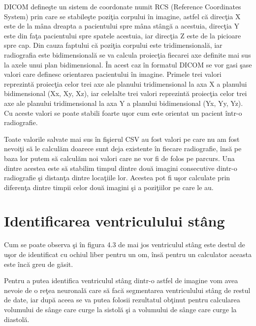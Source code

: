 \par

DICOM define\c{s}te un sistem de coordonate numit RCS (Reference Coordinates System) prin care se stabile\c{s}te pozi\c{t}ia corpului  \^{i}n imagine, astfel c\u{a} direc\c{t}ia X este de la m\^{a}na dreapta a pacientului spre m\^{a}na st\^{a}ng\u{a} a acestuia, direc\c{t}ia Y este din fa\c{t}a pacientului spre spatele acestuia, iar direc\c{t}ia Z este de la picioare spre cap. Din cauza faptului c\u{a} pozi\c{t}ia corpului este tridimensional\u{a}, iar radiografia este bidimensional\u{a} se va calcula proiec\c{t}ia fiecarei axe definite mai sus la axele unui plan bidimensional. \^{I}n acest caz \^{i}n formatul DICOM se vor gasi \c{s}ase valori care definesc orientarea pacientului \^{i}n imagine. Primele trei valori reprezint\u{a} proiec\c{t}ia celor trei axe ale planului tridimensional la axa X a planului bidimensional (Xx, Xy, Xz), iar celelalte trei valori reprezint\u{a} proiec\c{t}ia celor trei axe ale planului tridimensional la axa Y a planului bidimensional (Yx, Yy, Yz). Cu aceste valori se poate stabili foarte u\c{s}or cum este orientat un pacient \^{i}ntr-o radiografie.

\par

Toate valorile salvate mai sus \^{i}n fi\c{s}ierul CSV au fost valori pe care nu am fost nevoi\c{t}i s\u{a} le calcul\u{a}m doarece sunt deja existente \^{i}n fiecare radiografie, \^{i}ns\u{a} pe baza lor putem s\u{a} calcul\u{a}m noi valori care ne vor fi de folos pe parcurs. Una dintre acestea este s\u{a} stabilim timpul dintre dou\u{a} imagini consecutive dintr-o radiografie \c{s}i distan\c{t}a dintre loca\c{t}iile lor. Acestea pot fi u\c{s}or calculate prin diferen\c{t}a dintre timpii  celor dou\u{a} imagini \c{s}i a pozi\c{t}iilor pe care le au.

\section{Identificarea ventriculului st\^{a}ng}

Cum se poate observa \c{s}i \^{i}n figura 4.3 de mai jos ventriculul st\^{a}ng este destul de u\c{s}or de identificat cu ochiul liber pentru un om, \^{i}ns\u{a} pentru un calculator aceasta este \^{i}nc\u{a} greu de g\u{a}sit.

\par

Pentru a putea identifica ventriculul st\^{a}ng dintr-o astfel de imagine vom avea nevoie de o re\c{t}ea neuronal\u{a} care s\u{a} fac\u{a} segmentarea ventriculului st\^{a}ng de restul de date, iar dup\u{a} aceea se va putea folosii rezultatul ob\c{t}inut pentru calcularea volumului de s\^{a}nge care curge la sistol\u{a} \c{s}i a volumului de s\^{a}nge care curge la diastol\u{a}.

